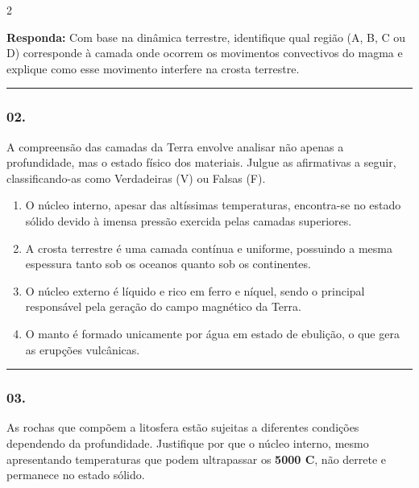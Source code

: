 \documentclass[twoside, 10pt, a4paper]{article}
\newlength{\espacoPreQuestao}
\newlength{\espacoQuestao}
\newlength{\espacoAlt}
\begin{document}
\begin{multicols*}{2}
\begin{boxresponda}
\textbf{Responda:} Com base na dinâmica terrestre, identifique qual região (A, B, C ou D) corresponde à camada onde ocorrem os movimentos convectivos do magma e explique como esse movimento interfere na crosta terrestre.
\end{boxresponda}
\par\vspace{\espacoQuestao}

\noindent\textcolor{CorLinha}{\rule{\linewidth}{0.5pt}} 
\par\vspace{\espacoPreQuestao}
\subsubsection*{02.} A compreensão das camadas da Terra envolve analisar não apenas a profundidade, mas o estado físico dos materiais. Julgue as afirmativas a seguir, classificando-as como Verdadeiras (V) ou Falsas (F).

\begin{enumerate}[label=(\ \ ), itemsep=\espacoAlt]
\item O núcleo interno, apesar das altíssimas temperaturas, encontra-se no estado sólido devido à imensa pressão exercida pelas camadas superiores.
\item A crosta terrestre é uma camada contínua e uniforme, possuindo a mesma espessura tanto sob os oceanos quanto sob os continentes.
\item O núcleo externo é líquido e rico em ferro e níquel, sendo o principal responsável pela geração do campo magnético da Terra.
\item O manto é formado unicamente por água em estado de ebulição, o que gera as erupções vulcânicas.
\end{enumerate}
\par\vspace{\espacoQuestao}

\noindent\textcolor{CorLinha}{\rule{\linewidth}{0.5pt}} 
\par\vspace{\espacoPreQuestao}
\subsubsection*{03.} As rochas que compõem a litosfera estão sujeitas a diferentes condições dependendo da profundidade. Justifique por que o núcleo interno, mesmo apresentando temperaturas que podem ultrapassar os \textbf{5000 \textdegree C}, não derrete e permanece no estado sólido.
\par\vspace{\espacoQuestao}


\end{multicols*}
\end{document}
